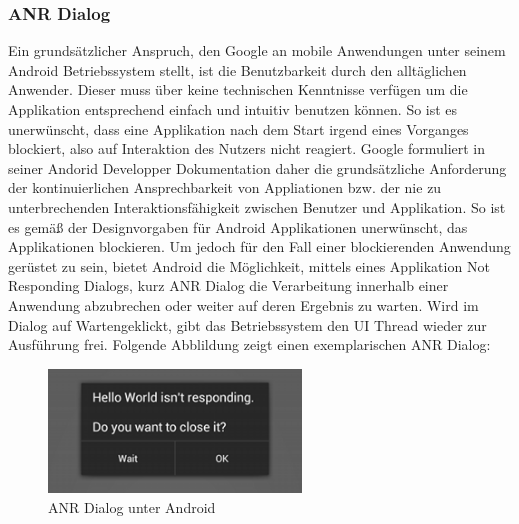 \documentclass[12pt,oneside,a4paper,bibtotoc,liststotoc]{scrreprt}
\begin{document}
\subsubsection{ANR Dialog}
Ein grundsätzlicher Anspruch, den Google an mobile Anwendungen unter seinem Android Betriebssystem stellt, ist die Benutzbarkeit durch den alltäglichen Anwender. Dieser muss über keine technischen Kenntnisse verfügen um die Applikation entsprechend einfach und intuitiv benutzen können. So ist es unerwünscht, dass eine Applikation nach dem Start irgend eines Vorganges blockiert, also auf Interaktion des Nutzers nicht reagiert. Google formuliert in seiner Andorid Developper Dokumentation daher die grundsätzliche Anforderung der kontinuierlichen Ansprechbarkeit von Appliationen bzw. der nie zu unterbrechenden Interaktionsfähigkeit zwischen Benutzer und Applikation. So ist es gemäß der Designvorgaben für Android Applikationen unerwünscht, das Applikationen blockieren. Um jedoch für den Fall einer blockierenden Anwendung gerüstet zu sein, bietet Android die Möglichkeit, mittels eines Applikation Not Responding Dialogs, kurz ANR Dialog die Verarbeitung innerhalb einer Anwendung abzubrechen oder weiter auf deren Ergebnis zu warten. Wird im Dialog auf \glqq Warten\grqq geklickt, gibt das Betriebssystem den UI Thread wieder zur Ausführung frei. Folgende Abblildung zeigt einen exemplarischen ANR Dialog:
\begin{figure}[H]
  \begin{centering}
    \includegraphics[width=0.6\textwidth]{img/anr-dialog.png}
    \caption{ANR Dialog unter Android}
    \label{ANR Dialog}
  \end{centering}
\end{figure}
\end{document}
